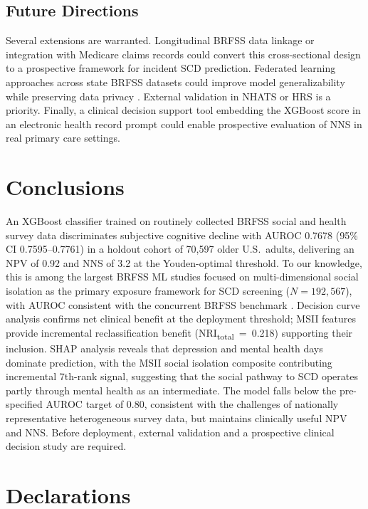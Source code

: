 \documentclass[12pt,a4paper]{article}
\begin{document}
\subsection{Future Directions}

Several extensions are warranted. Longitudinal BRFSS data linkage or integration
with Medicare claims records could convert this cross-sectional design to a
prospective framework for incident SCD prediction. Federated learning approaches
across state BRFSS datasets could improve model generalizability while preserving
data privacy \cite{Alam2026}. External validation in NHATS or HRS is a priority.
Finally, a clinical decision support tool embedding the XGBoost score in an
electronic health record prompt could enable prospective evaluation of NNS in
real primary care settings.

\section{Conclusions}

An XGBoost classifier trained on routinely collected BRFSS social and health
survey data discriminates subjective cognitive decline with AUROC 0.7678
(95\% CI 0.7595--0.7761) in a holdout cohort of 70,597 older U.S.\ adults,
delivering an NPV of 0.92 and NNS of 3.2 at the Youden-optimal threshold. To our knowledge, this is among the largest BRFSS ML studies focused on
multi-dimensional social isolation as the primary exposure framework for
SCD screening ($N = 192{,}567$), with AUROC consistent with the concurrent
BRFSS benchmark \cite{Nguyen2026}. Decision curve analysis confirms net
clinical benefit at the deployment threshold; MSII features provide
incremental reclassification benefit (NRI\textsubscript{total}~=~0.218)
supporting their inclusion.
SHAP analysis reveals that depression and mental health days dominate prediction,
with the MSII social isolation composite contributing incremental 7th-rank signal,
suggesting that the social pathway to SCD operates partly through mental health
as an intermediate. The model falls below the pre-specified AUROC target of 0.80,
consistent with the challenges of nationally representative heterogeneous survey
data, but maintains clinically useful NPV and NNS. Before deployment, external
validation and a prospective clinical decision study are required.

\section*{Declarations}
\end{document}
